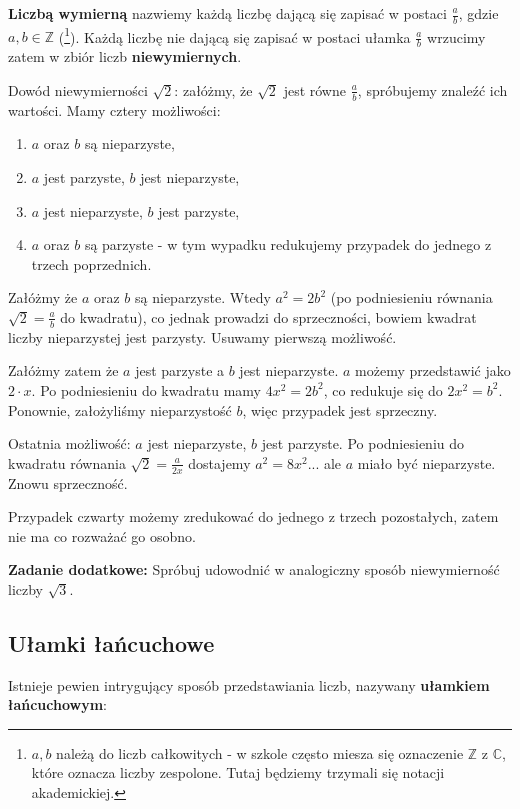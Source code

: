 \documentclass[11pt]{article}
\theoremstyle{definition}
\begin{document}
\textbf{Liczbą wymierną} nazwiemy każdą liczbę dającą się zapisać w postaci $\frac ab$, gdzie $a, b\in\mathbb Z$ (\footnote{$a, b$ należą do liczb całkowitych - w szkole często miesza się oznaczenie $\mathbb Z$ z $\mathbb C$, które oznacza liczby zespolone. Tutaj będziemy trzymali się notacji akademickiej.}). Każdą liczbę nie dającą się zapisać w postaci ułamka $\frac ab$ wrzucimy zatem w zbiór liczb \textbf{niewymiernych}.

Dowód niewymierności $\sqrt2$: załóżmy, że $\sqrt2$ jest równe $\frac ab$, spróbujemy znaleźć ich wartości. Mamy cztery możliwości:

\begin{enumerate}
\item $a$ oraz $b$ są nieparzyste,
\item $a$ jest parzyste, $b$ jest nieparzyste,
\item $a$ jest nieparzyste, $b$ jest parzyste,
\item $a$ oraz $b$ są parzyste - w tym wypadku redukujemy przypadek do jednego z trzech poprzednich.
\end{enumerate}

Załóżmy że $a$ oraz $b$ są nieparzyste. Wtedy $a^2 = 2b^2$ (po podniesieniu równania $\sqrt 2 = \frac ab$ do kwadratu), co jednak prowadzi do sprzeczności, bowiem kwadrat liczby nieparzystej jest parzysty. Usuwamy pierwszą możliwość.

Załóżmy zatem że $a$ jest parzyste a $b$ jest nieparzyste. $a$ możemy przedstawić jako $2\cdot x$. Po podniesieniu do kwadratu mamy $4x^2 = 2b^2$, co redukuje się do $2x^2=b^2$. Ponownie, założyliśmy nieparzystość $b$, więc przypadek jest sprzeczny.

Ostatnia możliwość: $a$ jest nieparzyste, $b$ jest parzyste. Po podniesieniu do kwadratu równania $\sqrt 2 = \frac{a}{2x}$ dostajemy $a^2 = 8x^2$... ale $a$ miało być nieparzyste. Znowu sprzeczność.

Przypadek czwarty możemy zredukować do jednego z trzech pozostałych, zatem nie ma co rozważać go osobno.

\textbf{Zadanie dodatkowe:} Spróbuj udowodnić w analogiczny sposób niewymierność liczby $\sqrt3$.

\subsection{Ułamki łańcuchowe}

Istnieje pewien intrygujący sposób przedstawiania liczb, nazywany \textbf{ułamkiem łańcuchowym}:
\end{document}

